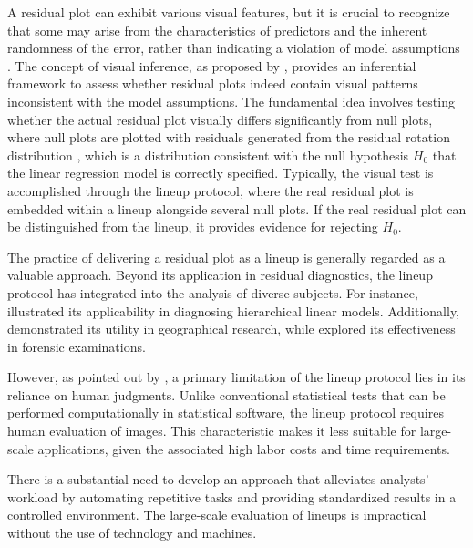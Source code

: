 \documentclass[]{interact}
\theoremstyle{plain}%
\theoremstyle{definition}
\theoremstyle{remark}
\begin{document}
A residual plot can exhibit various visual features, but it is crucial
to recognize that some may arise from the characteristics of predictors
and the inherent randomness of the error, rather than indicating a
violation of model assumptions \citep{li2023plot}. The concept of visual
inference, as proposed by \citet{buja2009statistical}, provides an
inferential framework to assess whether residual plots indeed contain
visual patterns inconsistent with the model assumptions. The fundamental
idea involves testing whether the actual residual plot visually differs
significantly from null plots, where null plots are plotted with
residuals generated from the residual rotation distribution
\citep{langsrud2005rotation}, which is a distribution consistent with
the null hypothesis \(H_0\) that the linear regression model is
correctly specified. Typically, the visual test is accomplished through
the lineup protocol, where the real residual plot is embedded within a
lineup alongside several null plots. If the real residual plot can be
distinguished from the lineup, it provides evidence for rejecting
\(H_0\).

The practice of delivering a residual plot as a lineup is generally
regarded as a valuable approach. Beyond its application in residual
diagnostics, the lineup protocol has integrated into the analysis of
diverse subjects. For instance,
\cite{loy2013diagnostic, loy2014hlmdiag, loy2015you} illustrated its
applicability in diagnosing hierarchical linear models. Additionally,
\citet{widen2016graphical} demonstrated its utility in geographical
research, while \citet{krishnan2021hierarchical} explored its
effectiveness in forensic examinations.

However, as pointed out by \citet{li2023plot}, a primary limitation of
the lineup protocol lies in its reliance on human judgments. Unlike
conventional statistical tests that can be performed computationally in
statistical software, the lineup protocol requires human evaluation of
images. This characteristic makes it less suitable for large-scale
applications, given the associated high labor costs and time
requirements.

There is a substantial need to develop an approach that alleviates
analysts' workload by automating repetitive tasks and providing
standardized results in a controlled environment. The large-scale
evaluation of lineups is impractical without the use of technology and
machines.
\end{document}

